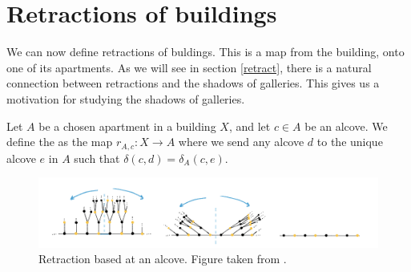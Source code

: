 \documentclass[11pt]{article}
\begin{document}




\section{Retractions of buildings}\label{5}


We can now define retractions of buldings. This is a map from the building, onto one of its apartments. As we will see in section \ref{retract}, there is a natural connection between retractions and the shadows of galleries. This gives us a motivation for studying the shadows of galleries. 

\begin{definition}
    Let $A$ be a chosen apartment in a building $X$, and let $c\in A$ be an alcove. We define the  as the map $r_{A,c}:X\longrightarrow A$ where we send any alcove $d$ to the unique alcove $e$ in $A$ such that $\delta(c,d)=\delta_A(c,e)$. 
\end{definition}
\begin{figure}[!htbp] 
    \begin{center}  
    \includegraphics[scale=0.7]{Screenshot 2023-04-18 at 14.50.22.png}
    \end{center}
    \caption{Retraction based at an alcove. Figure taken from \cite[p.25]{WILD}.}
\end{figure}
\end{document}
